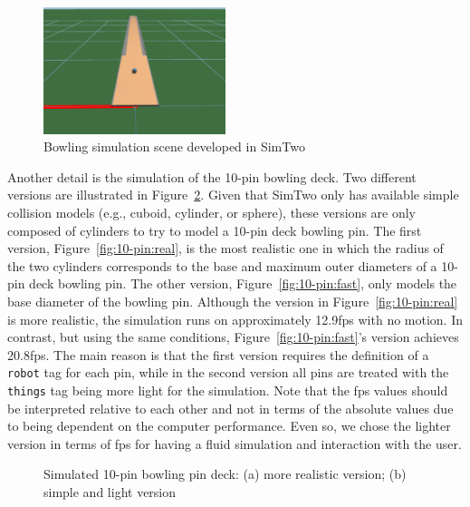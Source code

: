 \documentclass[10pt,a4paper,notitlepage,twocolumn,twoside]{article}
\begin{document}
\begin{figure}[!t]
  \centering
  \includegraphics[width=0.475\textwidth]{images/bowling-scene.png}
  \caption{Bowling simulation scene developed in SimTwo}
  \label{fig:scene}
\end{figure}

Another detail is the simulation of the 10-pin bowling deck. Two different versions are illustrated in Figure~\ref{fig:10-pin}. Given that SimTwo only has available simple collision models (e.g., cuboid, cylinder, or sphere), these versions are only composed of cylinders to try to model a 10-pin deck bowling pin. The first version, Figure~\ref{fig:10-pin:real}, is the most realistic one in which the radius of the two cylinders corresponds to the base and maximum outer diameters of a 10-pin deck bowling pin. The other version, Figure~\ref{fig:10-pin:fast}, only models the base diameter of the bowling pin. Although the version in Figure~\ref{fig:10-pin:real} is more realistic, the simulation runs on approximately 12.9fps with no motion. In contrast, but using the same conditions, Figure~\ref{fig:10-pin:fast}'s version achieves 20.8fps. The main reason is that the first version requires the definition of a \texttt{robot} tag for each pin, while in the second version all pins are treated with the \texttt{things} tag being more light for the simulation. Note that the fps values should be interpreted relative to each other and not in terms of the absolute values due to being dependent on the computer performance. Even so, we chose the lighter version in terms of fps for having a fluid simulation and interaction with the user.

\begin{figure}[!t]
  \centering
  \hfill
  \caption{Simulated 10-pin bowling pin deck: (a) more realistic version; (b) simple and light version}
  \label{fig:10-pin}
\end{figure}
\end{document}
